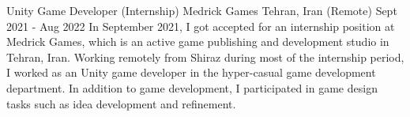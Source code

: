 

\begin{cventries}

  \cventry
    {Unity Game Developer (Internship)} %
    {Medrick Games} %
    {Tehran, Iran (Remote)} %
    {Sept 2021 - Aug 2022} %
    {
      In September 2021, I got accepted for an internship position at Medrick Games, which is an active game publishing and development studio in Tehran, Iran. Working remotely from Shiraz during most of the internship period, I worked as an Unity game developer in the hyper-casual game development department. In addition to game development, I participated in game design tasks such as idea development and refinement.
    }

\end{cventries}
